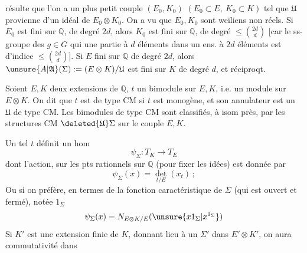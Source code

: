 résulte que l'on a un plus petit couple $(E_0,K_0)$ $(E_0\subset E,\ K_0\subset K)$
tel que $\mathfrak U$ provienne d'un idéal de $E_0\otimes K_0$.
On a vu que $E_0,K_0$ sont weiliens non réels. Si $E_0$ est fini sur $\mathbb Q$,
de degré $2d$, alors $K_0$ est fini sur $\mathbb Q$, de degré $\leq\binom{2d}{d}$
[car le ss-groupe des $g\in G$ qui  une partie à $d$ éléments
dans un ens. à $2d$ éléments est d'indice $\leq\binom{2d}{d}$].
 Si $E$ fini sur $\mathbb Q$ de degré $2d$, alors
$\unsure{A|\mathfrak A}(\Sigma):=(E\otimes K)/\mathfrak U$ est fini sur $K$ de degré $d$,
et réciproqt.

Soient $E,K$ deux extensions de $\mathbb Q$, $t$ un bimodule sur $E,K$, i.e. un module
sur $E\otimes K$. On dit que $t$ est de type CM si $t$ est monogène, et son annulateur
est un $\mathfrak U$ de type CM. Les bimodules de type CM  sont
classifiés, à isom près, par les structures CM $\deleted{\mathfrak U}\Sigma$ sur le couple $E,K$.

Un tel $t$ définit 
un hom
\[
\psi_\Sigma:T_K\longrightarrow T_E
\]
dont l'action, sur les pts rationnels sur $\mathbb Q$ (pour fixer les idées) est donnée par
\[
\psi_\Sigma(x)=\det_{t/E}(x_t)\,;
\]
Ou si on préfère, en termes de la fonction caractéristique de $\Sigma$
(qui est ouvert et fermé), notée  $1_\Sigma$
\[
\psi_\Sigma(x)=N_{E\otimes K/E}(\unsure{x1_\Sigma|x^{1_\Sigma}})
\]
Si $K'$ est une extension finie de $K$, 
donnant lieu à un $\Sigma'$ dans $E'\otimes K'$, on aura commutativité dans
